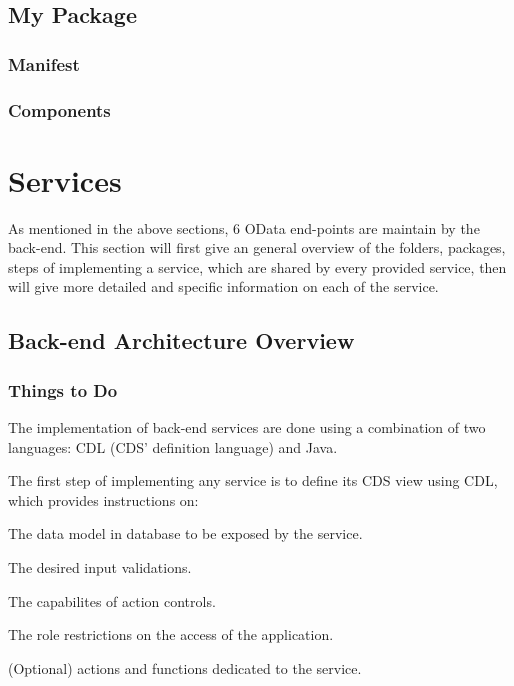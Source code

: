 \subsection{My Package}
\subsubsection{Manifest}
\subsubsection{Components}


\section{Services}

As mentioned in the above sections, 6 OData end-points are maintain by the back-end. This section will first give an general overview of the folders, packages, steps of implementing a service, which are shared by every provided service, then will give more detailed and specific information on each of the service.

\subsection{Back-end Architecture Overview}

\subsubsection{Things to Do}

The implementation of back-end services are done using a combination of two languages: CDL (CDS' definition language) and Java.

\bigskip
The first step of implementing any service is to define its CDS view using CDL, which provides instructions on:
\begin{compactenum}
	\item The data model in database to be exposed by the service.
	\item The desired input validations.
	\item The capabilites of action controls.
    \item The role restrictions on the access of the application.
    \item (Optional) actions and functions dedicated to the service.
\end{compactenum}

\bigskip


